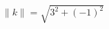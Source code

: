 \documentclass[preview]{standalone}
\begin{document}
\begin{align*}
\| k \| = \sqrt{3^2 + (-1)^2}
\end{align*}
\end{document}
